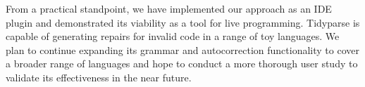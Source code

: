 \documentclass[sigplan,review,anonymous,acmsmall]{acmart}\settopmatter{printfolios=false,printccs=false,printacmref=false}
\begin{document}
From a practical standpoint, we have implemented our approach as an IDE plugin and demonstrated its viability as a tool for live programming. Tidyparse is capable of generating repairs for invalid code in a range of toy languages. We plan to continue expanding its grammar and autocorrection functionality to cover a broader range of languages and hope to conduct a more thorough user study to validate its effectiveness in the near future. %


\pagebreak

\appendix
\end{document}
